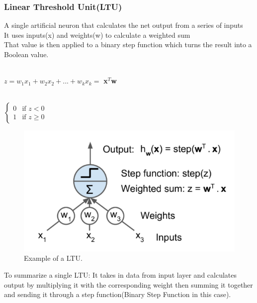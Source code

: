 \documentclass[article]{llncs}
\begin{document}
\subsubsection{Linear Threshold Unit(LTU)} A single artificial neuron that calculates the net output from a series of inputs\\ It uses inputs(x) and weights(w) to calculate a weighted sum \\ That value is then applied to a binary step function which turns the result into a Boolean value.
\begin{theorem}\\
    $z = w_1x_1+w_2x_2+...+w_kx_k = $ \textbf{x}$^T$\textbf{w}
\end{theorem}
\begin{theorem}\\
    $\begin{cases}
        0 & \text{if } z < 0\\
        1 & \text{if } z \geq 0
    \end{cases}$
\end{theorem}
\begin{figure}[H]
\centering
\includegraphics[scale=0.5]{fig1.PNG}
\caption{Example of a LTU.} \label{fig1}
\end{figure}
To summarize a single LTU: It takes in data from input layer and calculates output by multiplying it with the corresponding weight then summing it together and sending it through a step function(Binary Step Function in this case).
\end{document}
